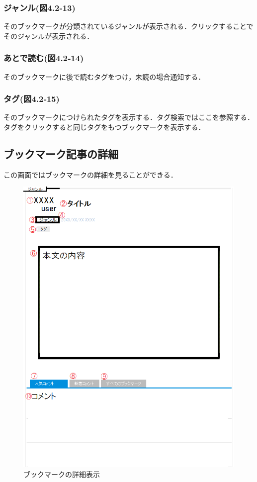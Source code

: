\subsubsection{ジャンル(図4.2‐13)}
そのブックマークが分類されているジャンルが表示される．クリックすることでそのジャンルが表示される．
\subsubsection{あとで読む(図4.2‐14)}
そのブックマークに後で読むタグをつけ，未読の場合通知する．
\subsubsection{タグ(図4.2‐15)}
そのブックマークにつけられたタグを表示する．タグ検索ではここを参照する．タグをクリックすると同じタグをもつブックマークを表示する．

\newpage

\subsection{ブックマーク記事の詳細}
この画面ではブックマークの詳細を見ることができる．

\begin{figure}[htb]
\centering
\includegraphics[width=13cm]{hatena-2.png}
\caption{ブックマークの詳細表示}\label{hatena-info}
\end{figure}

